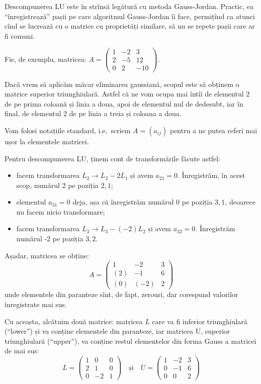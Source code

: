 \documentclass[11pt,a4paper]{article}
\newcommand\qq{\enquote}
\theoremstyle{dotless}
\theoremstyle{dotlessdr}
\begin{document}
\indent\indent Descompunerea LU este în strînsă legătură cu metoda Gauss-Jordan.
Practic, ea \qq{înregistrează} pașii pe care algoritmul Gauss-Jordan îi face,
permițînd ca atunci cînd se lucrează cu o matrice cu proprietăți similare, să nu
se repete pașii care ar fi comuni.

Fie, de exemplu, matricea:
$A = \begin{pmatrix}
  1 & -2 & 3 \\
  2 & -5 & 12 \\
  0 & 2 & -10
\end{pmatrix}$.

Dacă vrem să aplicăm măcar eliminarea gaussiană, scopul este să obținem o
matrice superior triunghiulară. Astfel că ne vom ocupa mai întîi de elementul
2 de pe prima coloană și linia a doua, apoi de elementul nul de dedesubt,
iar în final, de elementul 2 de pe linia a treia și coloana a doua.

Vom folosi notațiile standard, i.e.\ scriem $A = (a_{ij})$ pentru a ne putea
referi mai ușor la elementele matricei.

Pentru descompunerea LU, ținem cont de transformările făcute astfel:
\begin{itemize}
  \item facem transformarea $L_2 \to L_2 - 2L_1$ și avem $a_{21} = 0$.
    Înregistrăm, în acest scop, numărul 2 pe poziția $2, 1$;
  \item elementul $a_{31} = 0$ deja, așa că înregistrăm numărul 0 pe
    poziția $3, 1$, deoarece nu facem nicio transformare;
  \item facem transformarea $L_3 \to L_3 - (-2)L_2$ și avem $a_{32} = 0$.
    Înregistrăm numărul -2 pe poziția $3, 2$.
\end{itemize}

Așadar, matricea se obține:
\[
  A = \begin{pmatrix}
    1 & -2 & 3 \\
    (2) & -1 & 6 \\
    (0) & (-2) & 2
  \end{pmatrix}
\]
unde elementele din paranteze sînt, de fapt, zerouri, dar corespund valorilor
înregistrate mai sus.

Cu aceasta, alcătuim două matrice: matricea $L$ care va fi inferior triunghiulară
(``lower'') și va conține elementele din paranteze, iar matricea U, superior
triunghiulară (``upper''), va conține restul elementelor din forma Gauss a
matricei de mai sus:
\[
  L = \begin{pmatrix}
    1 & 0 & 0 \\
    2 & 1 & 0 \\
    0 & -2 & 1
  \end{pmatrix} \quad \text{și} \quad
  U = \begin{pmatrix}
    1 & -2 & 3 \\
    0 & -1 & 6 \\
    0 & 0 & 2
  \end{pmatrix}
\]
\end{document}
